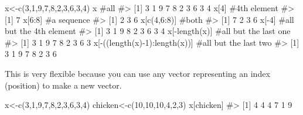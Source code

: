 \documentclass[
  letterpaper,
  DIV=11,
  numbers=noendperiod]{scrreprt}
\newenvironment{Shaded}{\begin{snugshade}}{\end{snugshade}}
\newcommand{\CommentTok}[1]{\textcolor[rgb]{0.37,0.37,0.37}{#1}}
\newcommand{\DecValTok}[1]{\textcolor[rgb]{0.68,0.00,0.00}{#1}}
\newcommand{\FunctionTok}[1]{\textcolor[rgb]{0.28,0.35,0.67}{#1}}
\newcommand{\NormalTok}[1]{\textcolor[rgb]{0.00,0.23,0.31}{#1}}
\newcommand{\OtherTok}[1]{\textcolor[rgb]{0.00,0.23,0.31}{#1}}
\newcommand{\SpecialCharTok}[1]{\textcolor[rgb]{0.37,0.37,0.37}{#1}}
\begin{document}
\begin{Shaded}
\begin{Highlighting}[]
\NormalTok{x}\OtherTok{\textless{}{-}}\FunctionTok{c}\NormalTok{(}\DecValTok{3}\NormalTok{,}\DecValTok{1}\NormalTok{,}\DecValTok{9}\NormalTok{,}\DecValTok{7}\NormalTok{,}\DecValTok{8}\NormalTok{,}\DecValTok{2}\NormalTok{,}\DecValTok{3}\NormalTok{,}\DecValTok{6}\NormalTok{,}\DecValTok{3}\NormalTok{,}\DecValTok{4}\NormalTok{)}
\NormalTok{x }\CommentTok{\#all}
\CommentTok{\#\textgreater{}  [1] 3 1 9 7 8 2 3 6 3 4}
\NormalTok{x[}\DecValTok{4}\NormalTok{] }\CommentTok{\#4th element}
\CommentTok{\#\textgreater{} [1] 7}
\NormalTok{x[}\DecValTok{6}\SpecialCharTok{:}\DecValTok{8}\NormalTok{] }\CommentTok{\#a sequence}
\CommentTok{\#\textgreater{} [1] 2 3 6}
\NormalTok{x[}\FunctionTok{c}\NormalTok{(}\DecValTok{4}\NormalTok{,}\DecValTok{6}\SpecialCharTok{:}\DecValTok{8}\NormalTok{)] }\CommentTok{\#both}
\CommentTok{\#\textgreater{} [1] 7 2 3 6}
\NormalTok{x[}\SpecialCharTok{{-}}\DecValTok{4}\NormalTok{] }\CommentTok{\#all but the 4th element}
\CommentTok{\#\textgreater{} [1] 3 1 9 8 2 3 6 3 4}
\NormalTok{x[}\SpecialCharTok{{-}}\FunctionTok{length}\NormalTok{(x)] }\CommentTok{\#all but the last one}
\CommentTok{\#\textgreater{} [1] 3 1 9 7 8 2 3 6 3}
\NormalTok{x[}\SpecialCharTok{{-}}\NormalTok{((}\FunctionTok{length}\NormalTok{(x)}\SpecialCharTok{{-}}\DecValTok{1}\NormalTok{)}\SpecialCharTok{:}\FunctionTok{length}\NormalTok{(x))]  }\CommentTok{\#all but the last two}
\CommentTok{\#\textgreater{} [1] 3 1 9 7 8 2 3 6}
\end{Highlighting}
\end{Shaded}

This is very flexible because you can use any vector representing an
index (position) to make a new vector.

\begin{Shaded}
\begin{Highlighting}[]
\NormalTok{x}\OtherTok{\textless{}{-}}\FunctionTok{c}\NormalTok{(}\DecValTok{3}\NormalTok{,}\DecValTok{1}\NormalTok{,}\DecValTok{9}\NormalTok{,}\DecValTok{7}\NormalTok{,}\DecValTok{8}\NormalTok{,}\DecValTok{2}\NormalTok{,}\DecValTok{3}\NormalTok{,}\DecValTok{6}\NormalTok{,}\DecValTok{3}\NormalTok{,}\DecValTok{4}\NormalTok{)}
\NormalTok{chicken}\OtherTok{\textless{}{-}}\FunctionTok{c}\NormalTok{(}\DecValTok{10}\NormalTok{,}\DecValTok{10}\NormalTok{,}\DecValTok{10}\NormalTok{,}\DecValTok{4}\NormalTok{,}\DecValTok{2}\NormalTok{,}\DecValTok{3}\NormalTok{)}
\NormalTok{x[chicken]}
\CommentTok{\#\textgreater{} [1] 4 4 4 7 1 9}
\end{Highlighting}
\end{Shaded}
\end{document}
